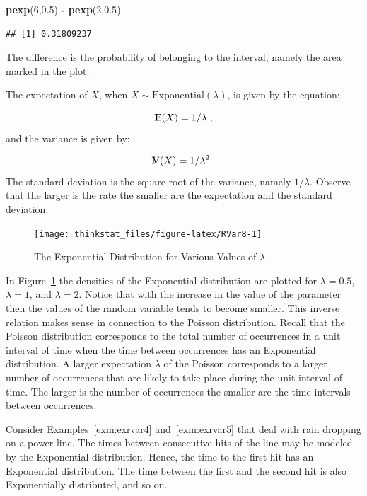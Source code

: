 \documentclass[]{krantz}
\makeatletter
\newenvironment{Shaded}{\begin{snugshade}}{\end{snugshade}}
\newcommand{\KeywordTok}[1]{\textcolor[rgb]{0.13,0.29,0.53}{\textbf{#1}}}
\newcommand{\DecValTok}[1]{\textcolor[rgb]{0.00,0.00,0.81}{#1}}
\newcommand{\FloatTok}[1]{\textcolor[rgb]{0.00,0.00,0.81}{#1}}
\newcommand{\StringTok}[1]{\textcolor[rgb]{0.31,0.60,0.02}{#1}}
\newcommand{\OperatorTok}[1]{\textcolor[rgb]{0.81,0.36,0.00}{\textbf{#1}}}
\newcommand{\NormalTok}[1]{#1}
\newcommand{\Expec}{{\rm I\kern-.3em E}}
\newcommand{\Var}{{\rm I\kern-.3em V}}
\newenvironment{kframe}{%
\medskip{}
\setlength{\fboxsep}{.8em}
 \def\at@end@of@kframe{}%
 \ifinner\ifhmode%
  \def\at@end@of@kframe{\end{minipage}}%
  \begin{minipage}{\columnwidth}%
 \fi\fi%
 \def\FrameCommand##1{\hskip\@totalleftmargin \hskip-\fboxsep
 \colorbox{shadecolor}{##1}\hskip-\fboxsep
     \hskip-\linewidth \hskip-\@totalleftmargin \hskip\columnwidth}%
 \MakeFramed {\advance\hsize-\width
   \@totalleftmargin\z@ \linewidth\hsize
   \@setminipage}}%
 {\par\unskip\endMakeFramed%
 \at@end@of@kframe}
\renewenvironment{Shaded}{\begin{kframe}}{\end{kframe}}
\theoremstyle{definition}
\theoremstyle{definition}
\theoremstyle{definition}
\theoremstyle{remark}
\let\BeginKnitrBlock\begin \let\EndKnitrBlock\end
\makeatother
\begin{document}
\begin{Shaded}
\begin{Highlighting}[]
\KeywordTok{pexp}\NormalTok{(}\DecValTok{6}\NormalTok{,}\FloatTok{0.5}\NormalTok{) }\OperatorTok{-}\StringTok{ }\KeywordTok{pexp}\NormalTok{(}\DecValTok{2}\NormalTok{,}\FloatTok{0.5}\NormalTok{)}
\end{Highlighting}
\end{Shaded}

\begin{verbatim}
## [1] 0.31809237
\end{verbatim}

The difference is the probability of belonging to the interval, namely
the area marked in the plot.

The expectation of \(X\), when \(X \sim \mathrm{Exponential}(\lambda)\),
is given by the equation:

\[\Expec(X) = 1/\lambda\;,\] and the variance is given by:

\[\Var(X) =1/\lambda^2\;.\] The standard deviation is the square root of
the variance, namely \(1/\lambda\). Observe that the larger is the rate
the smaller are the expectation and the standard deviation.

\begin{figure}

{\centering \texttt{[image: thinkstat\_files/figure-latex/RVar8-1]} 

}

\caption{The Exponential Distribution for Various Values of $\lambda$}\label{fig:RVar8}
\end{figure}

In Figure~\ref{fig:RVar8} the densities of the Exponential distribution
are plotted for \(\lambda = 0.5\), \(\lambda = 1\), and \(\lambda = 2\).
Notice that with the increase in the value of the parameter then the
values of the random variable tends to become smaller. This inverse
relation makes sense in connection to the Poisson distribution. Recall
that the Poisson distribution corresponds to the total number of
occurrences in a unit interval of time when the time between occurrences
has an Exponential distribution. A larger expectation \(\lambda\) of the
Poisson corresponds to a larger number of occurrences that are likely to
take place during the unit interval of time. The larger is the number of
occurrences the smaller are the time intervals between occurrences.

\BeginKnitrBlock{example}
\protect\hypertarget{exm:exrvar7}{}{\label{exm:exrvar7} }Consider
Examples~\ref{exm:exrvar4} and~\ref{exm:exrvar5} that deal with rain
dropping on a power line. The times between consecutive hits of the line
may be modeled by the Exponential distribution. Hence, the time to the
first hit has an Exponential distribution. The time between the first
and the second hit is also Exponentially distributed, and so on.
\EndKnitrBlock{example}
\end{document}
